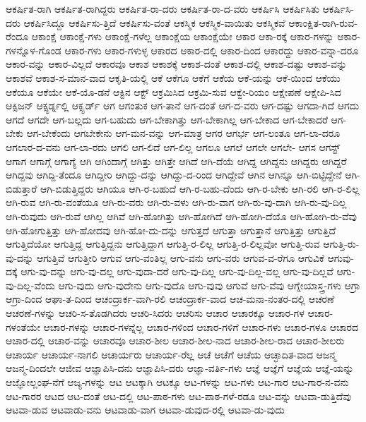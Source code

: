 {ಆಕರ್ಷಿತ-ರಾಗಿ
ಆಕರ್ಷಿತ-ರಾಗಿದ್ದರು
ಆಕರ್ಷಿತ-ರಾ-ದರು
ಆಕರ್ಷಿತ-ರಾ-ದ-ವರು
ಆಕರ್ಷಿಸಿ
ಆಕರ್ಷಿಸಿತು
ಆಕರ್ಷಿಸಿ-ದರು
ಆಕರ್ಷಿಸಿದ್ದೂ
ಆಕರ್ಷಿಸು-ತ್ತಿದೆ
ಆಕರ್ಷಿಸು-ವಂತೆ
ಆಕಸ್ಮಿಕ
ಆಕಸ್ಮಿಕ-ವಾಯಿತು
ಆಕಸ್ಮಿಕವೆ
ಆಕಾಂಕ್ಷಿತ-ರಾಗಿ-ರುವ-ರೆಂದೂ
ಆಕಾಂಕ್ಷೆ
ಆಕಾಂಕ್ಷೆ-ಗಳು
ಆಕಾಂಕ್ಷೆ-ಗಳೆಲ್ಲ
ಆಕಾಂಕ್ಷೆಯ
ಆಕಾಂಕ್ಷೆಯೇ
ಆಕಾರ
ಆಕಾ-ರಕ್ಕೆ
ಆಕಾರ-ಗಳನ್ನು
ಆಕಾರ-ಗಳನ್ನೊಳ-ಗೊಂಡ
ಆಕಾರ-ಗಳು
ಆಕಾರ-ಗಳುಳ್ಳ
ಆಕಾರದ
ಆಕಾರ-ದಲ್ಲಿ
ಆಕಾರ-ದಿಂದ
ಆಕಾರದ್ದು
ಆಕಾರ-ವನ್ನಾ-ದರೂ
ಆಕಾರ-ವನ್ನು
ಆಕಾರ-ವಿಲ್ಲದೆ
ಆಕಾರವೂ
ಆಕಾಶ
ಆಕಾಶಕ್ಕೆ
ಆಕಾಶ-ದಂತೆ
ಆಕಾಶ-ದಲ್ಲಿ
ಆಕಾಶ-ದಷ್ಟು
ಆಕಾಶ-ವನ್ನು
ಆಕಾಶವೆ
ಆಕಾಶ-ಸ-ಮಾನ-ವಾದ
ಆಕೃತಿ-ಯಲ್ಲಿ
ಆಕೆ
ಆಕೆಗೂ
ಆಕೆಗೆ
ಆಕೆಯ
ಆಕೆ-ಯನ್ನು
ಆಕೆ-ಯಿಂದ
ಆಕೆಯು
ಆಕೆಯೂ
ಆಕೆಯೇ
ಆಕೆ-ಯೊ-ಡನೆ
ಆಕ್ಟಿನ
ಆಕ್ಟ್
ಆಕ್ರಮಿಸಿದ
ಆಕ್ರಮಿ-ಸುವ
ಆಕ್ವೇ-ರಿಯಂ
ಆಕ್ಷೇಪಣೆ
ಆಕ್ಷೇಪಿ-ಸಿದ
ಆಕ್ಸಿಜನ್
ಆಕ್ಸ್ಫರ್ಡ್ನಲ್ಲಿ
ಆಕ್ಸ್ಫರ್ಡ್
ಆಗ
ಆಗಂತುಕ
ಆಗ-ತಾನೆ
ಆಗ-ದಂತೆ
ಆಗ-ದ-ವರು
ಆಗ-ದಷ್ಟು
ಆಗದಾ-ಗಿದೆ
ಆಗದು
ಆಗದೆ
ಆಗದೇ
ಆಗ-ಬಲ್ಲದು
ಆಗ-ಬಹುದು
ಆಗ-ಬೇಕಾಗಿತ್ತು
ಆಗ-ಬೇಕಾಗಿಲ್ಲ
ಆಗ-ಬೇಕಾದ
ಆಗ-ಬೇಕಾದರೆ
ಆಗ-ಬೇಕು
ಆಗ-ಬೇಕೆಂದು
ಆಗಬೇಕೇನು
ಆಗ-ಮನ-ವನ್ನು
ಆಗ-ಮಾತ್ರ
ಆಗರ
ಆಗರ್ಭ
ಆಗ-ಲಂತೂ
ಆಗ-ಲಾ-ದರೂ
ಆಗಲಾರ-ದ-ವನು
ಆಗ-ಲಾ-ರದು
ಆಗಲಿ
ಆಗ-ಲಿದೆ
ಆಗ-ಲಿಲ್ಲ
ಆಗಲೂ
ಆಗಲೆ
ಆಗಲೇ
ಆಗಲೇ-
ಆಗಸ
ಆಗಸ್ಟ್
ಆಗಾಗ
ಆಗಾಗ್ಗೆ
ಆಗಾಗ್ಯೆ
ಆಗಿ
ಆಗಿಂದಾಗ್ಗೆ
ಆಗಿತ್ತು
ಆಗಿತ್ತೇ
ಆಗಿದೆ
ಆಗಿ-ದೆಯೆ
ಆಗಿದ್ದ
ಆಗಿದ್ದನು
ಆಗಿದ್ದರು
ಆಗಿದ್ದರೆ
ಆಗಿದ್ದವು
ಆಗಿದ್ದಿ-ತೆಂದೂ
ಆಗಿದ್ದೀರಿ
ಆಗಿದ್ದು-ದನ್ನು
ಆಗಿದ್ದು-ದ-ರಿಂದ
ಆಗಿದ್ದೇವೆ
ಆಗಿನ
ಆಗಿನ್ನೂ
ಆಗಿ-ಬಿಟ್ಟಿದ್ದೇನೆ
ಆಗಿ-ಬಿಡುತ್ತಾರೆ
ಆಗಿ-ಬಿಡುತ್ತಿದ್ದರು
ಆಗಿಯೂ
ಆಗಿ-ರ-ಬಹುದೆ
ಆಗಿ-ರ-ಬಹು-ದೆಂದು
ಆಗಿ-ರ-ಬೇಕು
ಆಗಿ-ರಲಿ
ಆಗಿ-ರ-ಲಿಲ್ಲ
ಆಗಿ-ರುವ
ಆಗಿ-ರು-ವಂತೆಯೂ
ಆಗಿ-ರು-ವರು
ಆಗಿ-ರು-ವಳು
ಆಗಿ-ರು-ವಾಗ
ಆಗಿ-ರು-ವು-ದಾಗಿ
ಆಗಿ-ರು-ವು-ದಿಲ್ಲ
ಆಗಿ-ರುವುದು
ಆಗಿ-ರುವೆ
ಆಗಿಲ್ಲ
ಆಗಿವೆ
ಆಗಿ-ಹೋಗಿತ್ತು
ಆಗಿ-ಹೋಗಿದೆ
ಆಗಿ-ಹೋಗಿ-ದೆಯೊ
ಆಗಿ-ಹೋಗಿ-ರು-ವೆವು
ಆಗಿ-ಹೋಗುತ್ತಿತ್ತು
ಆಗಿ-ಹೋದವು
ಆಗಿ-ಹೋ-ದು-ದನ್ನು
ಆಗುತ್ತದೆ
ಆಗುತ್ತಾ
ಆಗುತ್ತಾನೆ
ಆಗುತ್ತಿತ್ತು
ಆಗುತ್ತಿದೆ
ಆಗುತ್ತಿದೆಯೋ
ಆಗುತ್ತಿದ್ದ
ಆಗುತ್ತಿದ್ದನು
ಆಗುತ್ತಿದ್ದಾಗ
ಆಗುತ್ತಿ-ರ-ಲಿಲ್ಲ
ಆಗುತ್ತಿ-ರ-ಲಿಲ್ಲವೋ
ಆಗುತ್ತಿ-ರುವ
ಆಗುತ್ತಿ-ರು-ವು-ದನ್ನು
ಆಗುತ್ತಿವೆ
ಆಗುತ್ತೀರಿ
ಆಗುವ
ಆಗು-ವಂತಿಲ್ಲ
ಆಗು-ವನು
ಆಗು-ವರು
ಆಗುವ-ವ-ರೆಗೂ
ಆಗುವಿಕೆ
ಆಗುವು-ದಕ್ಕೆ
ಆಗು-ವು-ದನ್ನು
ಆಗು-ವು-ದಲ್ಲ
ಆಗು-ವುದಾ-ದರೆ
ಆಗು-ವು-ದಿಲ್ಲ
ಆಗು-ವು-ದಿಲ್ಲ-ವಲ್ಲ
ಆಗು-ವು-ದಿಲ್ಲವೆ
ಆಗು-ವು-ದಿಲ್ಲ-ವೆಂದು
ಆಗು-ವುದು
ಆಗು-ವುದೇನು
ಆಗು-ವುದೊ
ಆಗು-ವುವು
ಆಗುವೆ
ಆಗು-ವೆವು
ಆಗ್ನೇಯಾಸ್ತ್ರ-ಗಳು
ಆಗ್ರಾ
ಆಗ್ರಾ-ದಿಂದ
ಆಘಾ-ತ-ದಿಂದ
ಆಚಂದ್ರಾರ್ಕ-ವಾಗಿ-ರಲಿ
ಆಚಂದ್ರಾರ್ಕ-ವಾದ
ಆಚ-ಮನಾ-ನಂತರ-ದಲ್ಲಿ
ಆಚರಣೆ
ಆಚರಣೆ-ಗಳನ್ನು
ಆಚರಿ-ಸ-ತೊಡಗಿದರು
ಆಚರಿ-ಸಿದರು
ಆಚರಿಸು
ಆಚಾರ
ಆಚಾರಕ್ಕೂ
ಆಚಾರ-ಗಳ
ಆಚಾರ-ಗಳಂತೆಯೇ
ಆಚಾರ-ಗಳನ್ನು
ಆಚಾರ-ಗಳನ್ನೆಲ್ಲ
ಆಚಾರ-ಗಳಿಂದ
ಆಚಾರ-ಗಳಿಗೆ
ಆಚಾರ-ಗಳು
ಆಚಾರ-ಗಳೂ
ಆಚಾರದ
ಆಚಾರ-ದಲ್ಲಿ
ಆಚಾರ-ವನ್ನು
ಆಚಾರವೂ
ಆಚಾರ-ಶೀಲ
ಆಚಾರ-ಶೀಲ-ನಾದ
ಆಚಾರ-ಶೀಲ-ರಾದ
ಆಚಾರ-ಶೀಲರು
ಆಚಾರ್ಯ
ಆಚಾರ್ಯ-ನಾಗಲಿ
ಆಚಾರ್ಯರು
ಆಚಾರ್ಯ-ರೆಲ್ಲ
ಆಚೆ
ಆಚೆಗೆ
ಆಚೆಯ
ಆಚ್ಛಾದಿತ-ವಾದ
ಆಜನ್ಮ
ಆಜನ್ಮ-ದಿಂದಲೇ
ಆಜೀವ
ಆಜ್ಞಾಪಿಸಿ-ದನು
ಆಜ್ಞಾಪಿಸಿ-ದರು
ಆಜ್ಞಾ-ವರ್ತಿ-ಗಳು
ಆಜ್ಞೆ
ಆಜ್ಞೆಗೆ
ಆಜ್ಞೆಯ
ಆಜ್ಞೆ-ಯನ್ನು
ಆಜ್ಞೋಲ್ಲಂಘ-ನೆಗೆ
ಆಜ್ಯ-ಗಳನ್ನು
ಆಟ
ಆಟಕ್ಕಾಗಿ
ಆಟಕ್ಕೂ
ಆಟ-ಗಳನ್ನು
ಆಟ-ಗಳು
ಆಟ-ಗಾರ
ಆಟ-ಗಾರ-ನ-ವನು
ಆಟ-ಗಾರರ
ಆಟದ
ಆಟ-ದಂತೆ
ಆಟ-ದಲ್ಲಿ
ಆಟ-ಪಾಠ-ಗಳು
ಆಟ-ಪಾಠ-ಗಳೆ-ರಡೂ
ಆಟ-ವನ್ನು
ಆಟವಾ-ಡುತ್ತಿದೆವು
ಆಟವಾ-ಡುವ
ಆಟವಾಡು-ವನು
ಆಟವಾಡು-ವಾಗ
ಆಟವಾ-ಡುವುದ-ರಲ್ಲಿ
ಆಟವಾ-ಡು-ವುದು
}
